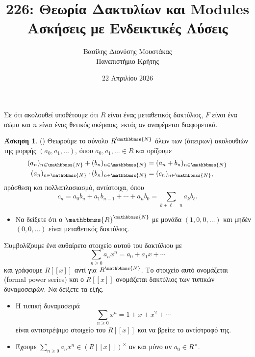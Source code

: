 \documentclass[12pt,a4paper,reqno]{amsart}
\title{226: Θεωρία Δακτυλίων και Modules \\ Ασκήσεις με Ενδεικτικές Λύσεις}
\author[Β.~Δ. Μουστακας]{Βασίλης Διονύσης Μουστάκας \\ Πανεπιστήμιο Κρήτης}
\date{22 Απριλίου 2026}
\theoremstyle{definition}
\newtheorem{exercise}{Άσκηση}
\newcommand{\NN}{\mathbbmss{N}}
\newcommand{\RR}{\mathbbmss{R}}
\newcommand{\defn}[1]{{\color{mylightblue}{#1}}}
\begin{document}
\begingroup
\def\uppercasenonmath#1{} %
\let\MakeUppercase\relax %
\maketitle
\endgroup

\setcounter{exercise}{28}
\setcounter{equation}{7}
\renewcommand{\thesubsection}{\thesection.\arabic{subsection}}

Σε ότι ακολουθεί υποθέτουμε ότι $R$ είναι ένας μεταθετικός δακτύλιος, $F$ είναι ένα σώμα και $n$ είναι ένας θετικός ακέραιος, εκτός αν αναφέρεται διαφορετικά.

\begin{exercise}{\rm(\cite[Άσκηση~7.2.3]{DF04})}
  \label{ex:DF_7.2.3}
  Θεωρούμε το σύνολο $R^{\NN}$ όλων των (άπειρων) ακολουθιών της μορφής $(a_0, a_1, \dots)$, όπου $a_0, a_1, \dots \in R$ και ορίζουμε 
  \begin{align*}
    (a_n)_{n \in \NN} + (b_n)_{n \in \NN} &= (a_n + b_n)_{n \in \NN} \\
    (a_n)_{n \in \NN}\cdot(b_n)_{n \in \NN} &= (c_n)_{n \in \NN},
  \end{align*}
  πρόσθεση και πολλαπλασιασμό, αντίστοιχα, όπου 
  \[
  c_n = a_0b_n + a_1b_{n-1} + \cdots + a_nb_0 = \sum_{k + \ell = n} a_kb_\ell.
  \]
  \begin{itemize}
    \item[(α)] Να δείξετε ότι ο $\RR^\NN$ με μονάδα $(1, 0, 0, \dots)$ και μηδέν $(0, 0, \dots)$ είναι μεταθετικός δακτύλιος.
  \end{itemize}
  Συμβολίζουμε ένα αυθαίρετο στοιχείο αυτού του δακτύλιου με 
  \[
  \sum_{n \ge 0} a_n x^n = a_0 + a_1x + \cdots 
  \]
  και γράφουμε $R[\![x]\!]$ αντί για $R^\NN$. Το στοιχείο αυτό ονομάζεται \defn{τυπική δυναμοσειρά} (formal power series) και ο $R[\![x]\!]$ ονομάζεται δακτύλιος των τυπικών δυναμοσειρών. Να δείξετε τα εξής.
  \begin{itemize}
    \item[(β)] Η τυπική δυναμοσειρά 
    \[
    \sum_{n\ge0}x^n = 1 + x + x^2 + \cdots 
    \] 
    είναι αντιστρέψιμο στοιχείο του $R[\![x]\!]$ και να βρείτε το αντίστροφό της.
    \item[(γ)] Έχουμε $\sum_{n\ge0} a_nx^n \in \left(
      R[\![x]\!]
    \right)^\times$ αν και μόνο αν $a_0 \in R^\times$. 
  \end{itemize}
\end{exercise}
\end{document}
